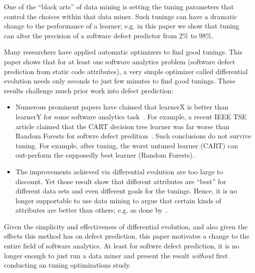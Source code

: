 \documentclass{sig-alternative}
\newcommand{\bi}{\begin{itemize}[leftmargin=0.4cm]}
\newcommand{\ei}{\end{itemize}}
\begin{document}


One of the ``black arts'' of data mining is setting the tuning
parameters that control  the choices within that data miner.
Such tunings can have a dramatic change to the performance of a learner;
e.g. in this paper we show that tuning can alter the precision of
a software defect predictor from 2\% to 98\%.

Many researchers have applied automatic optimizers to find good tunings.
This paper shows that for at least one software analytics problem
(software defect prediction from static code attributes),   a
very simple optimizer called differential evolution needs only   seconds
to just  few minutes to find good tunings.  
These results   challenge much prior work into defect prediction:
\bi 
\item 
Numerous   prominent papers have claimed 
that learnerX is better than learnerY for some software analytics task~\cite{lessmann2008benchmarking,hall11,me07b}.
For example, a recent IEEE TSE article claimed that the 
CART decision tree learner was far worse than Random Forests for
softwre defect predition~\cite{lessmann2008benchmarking}. 
Such conclusions do not survive tuning.
For example,
after tuning, the worst untuned learner (CART) can out-perform the supposedly
best learner (Random Forests).
\item
The improvements achieved via differential evolution are too large to discount.
Yet those result show that different attributes are ``best'' for different
data sets and even different goals for the tunings. Hence, it is no longer
supportable to use data mining to argue that certain kinds of attributes 
are better than others; e.g. as  done by~\cite{rahman2013how}. 
\ei 
Given the simplicity and effectiveness of differential evolution,
and also given the effects this method has on defect prediction, this
paper  motivates  a change to the entire field of software analytics.
At least for softwre defect prediction,
it is no longer enough to just run a data miner and present the result
{\em without} first conducting an tuning optimizations study.
\end{document}
